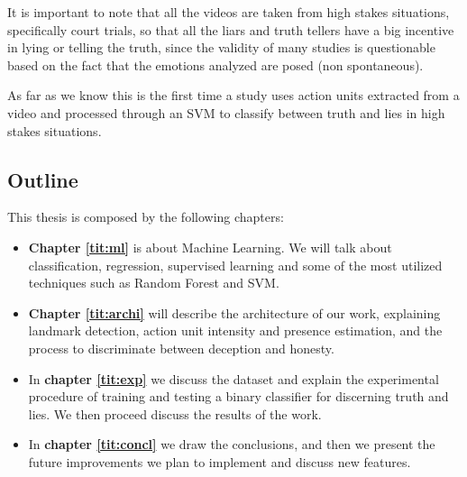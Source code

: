 It is important to note that all the videos are taken from high stakes situations, specifically court trials, so that all the liars and truth tellers have a big incentive in lying or telling the truth, since the validity of many studies is questionable based on the fact that the emotions analyzed are posed (non spontaneous). 

As far as we know this is the first time a study uses action units extracted from a video and processed through an SVM to classify between truth and lies in high stakes situations.

\subsection{Outline}
This thesis is composed by the following chapters:

\begin{itemize}
	\item \textbf{Chapter \ref{tit:ml}} is about Machine Learning. We will talk about classification, regression, supervised learning and some of the most utilized techniques such as Random Forest and SVM.
	\item \textbf{Chapter \ref{tit:archi}} will describe the architecture of our work, explaining landmark detection, action unit intensity and presence estimation, and the process to discriminate between deception and honesty.
	\item In \textbf{chapter \ref{tit:exp}} we discuss the dataset and explain the experimental procedure of training and testing a binary classifier for discerning truth and lies. We then proceed discuss the results of the work.
	\item In \textbf{chapter \ref{tit:concl}} we draw the conclusions, and then we present the future improvements we plan to implement and discuss new features.
\end{itemize}
